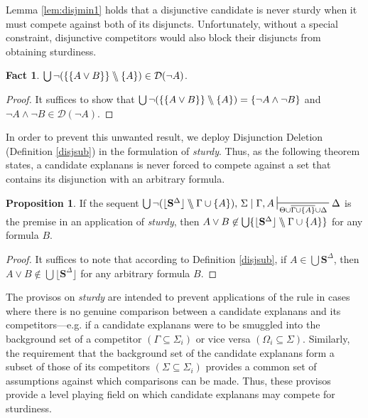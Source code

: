 \documentclass{article}
\theoremstyle{definition}
\theoremstyle{definition}
\theoremstyle{definition}
\theoremstyle{definition}
\theoremstyle{remark}
\theoremstyle{definition}
\newtheorem{proposition}{Proposition}
\theoremstyle{definition}
\newtheorem{fact}{Fact}
\begin{document}
Lemma \ref{lem:disjmin1} holds that a disjunctive candidate is never sturdy when it must compete against both of its disjuncts. Unfortunately, without a special constraint, disjunctive competitors would also block their disjuncts from obtaining sturdiness. 

\begin{fact}
	$ \bigcup\neg(\{\{A \vee B\}\} \bbslash \{A\}) \in \mathcal{D}(\neg A) $.
	
	\begin{proof}
		It suffices to show that $ \bigcup\neg(\{\{A \vee B\}\} \bbslash \{A\}) = \{\neg A \wedge \neg B\} $ and $ \neg A \wedge \neg B \in \mathcal{D}(\neg A).$
	\end{proof}
	
\end{fact}

In order to prevent this unwanted result, we deploy Disjunction Deletion (Definition \ref{disjsub}) in  the formulation of \textit{sturdy}. Thus, as the following theorem states, a candidate explanans is never forced to compete against a set that contains its disjunction with an arbitrary formula.

\begin{proposition}\label{disjmin2}
	If the sequent $\bigcup\neg(\lfloor\mathbf{S}^\Delta\rfloor \bbslash\Gamma\cup\{A\}),\,\Sigma \mid\Gamma, A \sststile{\Theta\cup \overline{\Gamma\cup\{A\}} \cup\Delta}{}\Delta$ is the premise in an application of \textit{sturdy}, then $ A \vee B \not\in \bigcup \{\lfloor\mathbf{S}^\Delta\rfloor \bbslash\Gamma\cup\{A\}\} $ for any formula $ B $.
	
	\begin{proof}
		It suffices to note that according to Definition \ref{disjsub}, if $ A \in \bigcup\mathbf{S}^\Delta $, then $ A \vee B \not\in \bigcup\lfloor\mathbf{S}^\Delta\rfloor  $ for any arbitrary formula $ B $.
		
	\end{proof}
	
\end{proposition}

The provisos on \textit{sturdy} are intended to prevent applications of the rule in cases where there is no genuine comparison between a candidate explanans and its competitors---e.g. if a candidate explanans were to be smuggled into the background set of a competitor $(\Gamma \subseteq \Sigma_i)$ or vice versa $(\Omega_i \subseteq \Sigma)$. Similarly, the requirement that the background set of the candidate explanans form a subset of those of its competitors $(\Sigma\subseteq \Sigma_i)$ provides a common set of assumptions against which comparisons can be made.  Thus, these provisos provide a level playing field on which candidate explanans may compete for sturdiness.
\end{document}
